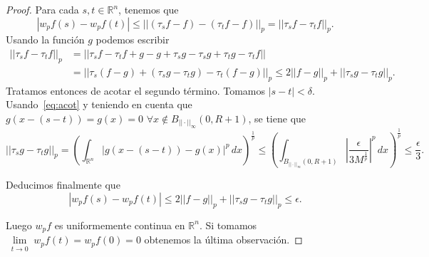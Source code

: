 \begin{proof}
\noindent Para cada $s,t \in \mathbb{R}^n$, tenemos que
\begin{equation}
    |w_pf(s)-w_pf(t)| \leq ||(\tau_sf-f)-(\tau_tf-f)||_p = ||\tau_sf-\tau_tf||_p.
\end{equation}
Usando la función $g$ podemos escribir
\begin{align}
||\tau_sf-\tau_tf||_p &= ||\tau_sf-\tau_tf +g -g + \tau_sg -\tau_sg +\tau_tg -\tau_tf || \\
&= ||\tau_s(f-g)+(\tau_sg-\tau_tg) - \tau_t (f-g)||_p 
\leq 2 ||f-g||_p + ||\tau_sg-\tau_tg||_p.
\end{align}
Tratamos entonces de acotar el segundo término. Tomamos $|s-t| < \delta $. Usando~\eqref{eq:acot} y teniendo en cuenta que $g(x-(s-t))=g(x) = 0 \,\, \forall x \notin B_{||\cdot||_\infty}(0,R+1)$, se tiene que 
\begin{equation}
    ||\tau_sg-\tau_tg||_p = \left( \int_{\mathbb{R}^n}|g(x-(s-t))-g(x)|^{p} \, dx\right)^{\frac{1}{p}} \leq \left( \int_{B_{||\cdot||_\infty}(0,R+1)}\left|\frac{\epsilon}{3M^{\frac{1}{p}}}\right|^p \, dx\right)^{\frac{1}{p}} \leq \frac{\epsilon}{3}.
\end{equation}

\noindent Deducimos finalmente que 
\begin{equation}
    |w_pf(s)-w_pf(t)|\leq 2 ||f-g||_p + ||\tau_sg-\tau_tg||_p \leq \epsilon.
\end{equation}


\noindent Luego $w_pf$ es uniformemente continua en $\mathbb{R}^n$. Si tomamos  $\underset{\substack{t \rightarrow 0}}{\lim}w_pf(t)=w_pf(0)=0$ obtenemos la última observación.








    
\end{proof}


